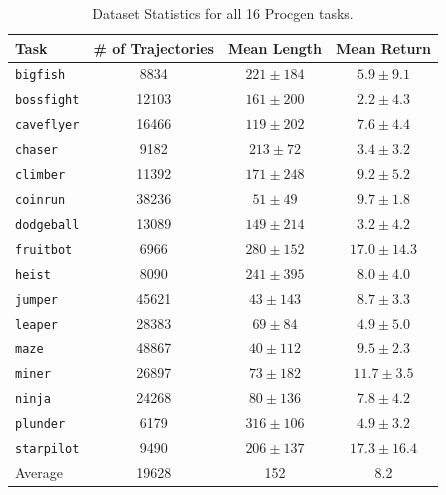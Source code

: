 \begin{table}[]
    \centering
    \caption{Dataset Statistics for all 16 Procgen tasks.}
    \begin{tabular}{l c c c}
    \toprule
    \textbf{Task} & \textbf{\# of Trajectories} &  \textbf{Mean Length}  & \textbf{Mean Return} \\
    \midrule
     \texttt{bigfish} &      8834 &    $221\pm184$ &  $ 5.9 \pm  9.1$\\
   \texttt{bossfight} &     12103 &    $161\pm200$ &  $ 2.2 \pm  4.3$\\
   \texttt{caveflyer} &     16466 &    $119\pm202$ &  $ 7.6 \pm  4.4$\\
      \texttt{chaser} &      9182 &    $213\pm72$  &  $ 3.4 \pm  3.2$\\
     \texttt{climber} &     11392 &    $171\pm248$ &  $ 9.2 \pm  5.2$\\
     \texttt{coinrun} &     38236 &     $51\pm49$  &  $ 9.7 \pm  1.8 $\\
   \texttt{dodgeball} &     13089 &    $149\pm214$ &  $ 3.2 \pm  4.2$\\
    \texttt{fruitbot} &      6966 &    $280\pm152$ &  $17.0 \pm 14.3 $\\
       \texttt{heist} &      8090 &    $241\pm395$ &  $ 8.0 \pm  4.0$\\
      \texttt{jumper} &     45621 &     $43\pm143$ &  $ 8.7 \pm  3.3$\\
      \texttt{leaper} &     28383 &     $69\pm84$  &  $ 4.9 \pm  5.0$\\
        \texttt{maze} &     48867 &     $40\pm112$ &  $ 9.5 \pm  2.3$\\
       \texttt{miner} &     26897 &     $73\pm182$ &  $11.7 \pm  3.5 $\\
       \texttt{ninja} &     24268 &     $80\pm136$ &  $ 7.8 \pm  4.2$\\
     \texttt{plunder} &      6179 &    $316\pm106$ &  $ 4.9 \pm  3.2$\\
   \texttt{starpilot} &      9490 &    $206\pm137$ &  $17.3 \pm 16.4 $\\
    \midrule
     Average &  19628 & 152 &  8.2\\
    \bottomrule
    \end{tabular}
    \label{tab:procgendata}
\end{table}

